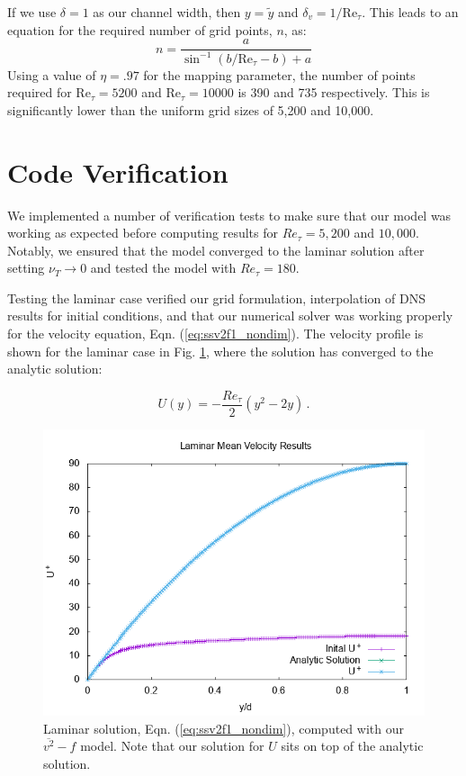 \documentclass[a4paper,11pt]{article}
\begin{document}
If we use $\delta = 1$ as our channel width, then $y = \tilde{y}$ and $\delta_v = 1/\mathrm{Re}_{\tau}$.  This leads to an equation for the required number of grid points, $n$, as:
\begin{equation}
 n = \frac{a}{\sin^{-1}(b/\mathrm{Re}_{\tau}-b)+a}
\end{equation}
Using a value of $\eta = .97$ for the mapping parameter, the number of points required for $\mathrm{Re}_{\tau}=5200$ and $\mathrm{Re}_{\tau}=10000$ is 390 and 735 respectively. This is significantly lower than the uniform grid sizes of 5,200 and 10,000.


\section{Code Verification}

We implemented a number of verification tests to make sure that our model was
working as expected before computing results for $Re_\tau = 5,200$ and
$10,000$. Notably, we ensured that the model converged to the laminar solution
after setting $\nu_T \rightarrow 0$ and tested the model with $Re_\tau = 180$. 


Testing the laminar case verified our grid formulation, interpolation of DNS
results for initial conditions, and that our numerical solver was working
properly for the velocity equation, Eqn.
(\ref{eq:ssv2f1_nondim}). The velocity profile is shown for the laminar case in Fig.
\ref{fig:laminar}, where the solution has converged to the analytic
solution: 

\begin{equation*}
  U(y) = -\frac{Re_\tau}{2}\left(y^2 - 2y\right) \, .
\end{equation*}

\begin{figure}
 \centering
 \includegraphics[width=.7\textwidth]{laminar}
 \caption{Laminar solution, Eqn. (\ref{eq:ssv2f1_nondim}), computed with
our $\overline{v^2}-f$ model. Note that our solution for $U$ sits on top of the
analytic solution.}
 \label{fig:laminar}
\end{figure}
\end{document}
